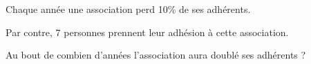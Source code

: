 
Chaque année une association perd 10\% de ses adhérents. 

Par contre, 7 personnes prennent leur adhésion à cette association. 

Au bout de combien d'années l'association aura doublé ses adhérents ?